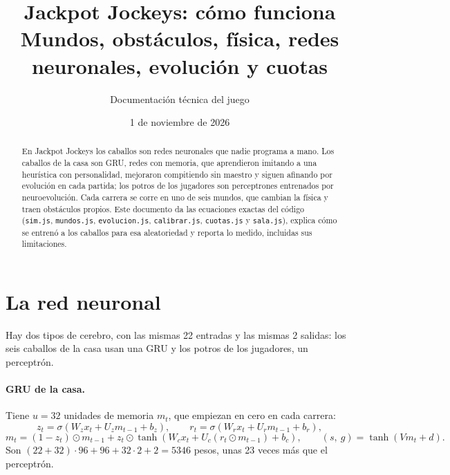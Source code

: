\documentclass[11pt,letterpaper]{article}
\title{\textbf{Jackpot Jockeys: cómo funciona}\\[4pt]\large Mundos, obstáculos, física, redes neuronales, evolución y cuotas}
\author{Documentación técnica del juego}
\date{1 de noviembre de 2026}
\begin{document}
\maketitle

\begin{abstract}
En Jackpot Jockeys los caballos son redes neuronales que nadie programa a mano. Los caballos de la casa son GRU, redes con memoria, que aprendieron imitando a una heurística con personalidad, mejoraron compitiendo sin maestro y siguen afinando por evolución en cada partida; los potros de los jugadores son perceptrones entrenados por neuroevolución. Cada carrera se corre en uno de seis mundos, que cambian la física y traen obstáculos propios. Este documento da las ecuaciones exactas del código (\texttt{sim.js}, \texttt{mundos.js}, \texttt{evolucion.js}, \texttt{calibrar.js}, \texttt{cuotas.js} y \texttt{sala.js}), explica cómo se entrenó a los caballos para esa aleatoriedad y reporta lo medido, incluidas sus limitaciones.
\end{abstract}

\tableofcontents

\section{La red neuronal}
Hay dos tipos de cerebro, con las mismas 22 entradas y las mismas 2 salidas: los seis caballos de la casa usan una GRU y los potros de los jugadores, un perceptrón.

\paragraph{GRU de la casa.} Tiene $u = 32$ unidades de memoria $m_t$, que empiezan en cero en cada carrera:
\begin{equation}
z_t = \sigma\!\left(W_z x_t + U_z m_{t-1} + b_z\right), \qquad r_t = \sigma\!\left(W_r x_t + U_r m_{t-1} + b_r\right),
\end{equation}
\begin{equation}
m_t = (1 - z_t) \odot m_{t-1} + z_t \odot \tanh\!\left(W_c x_t + U_c (r_t \odot m_{t-1}) + b_c\right), \qquad (s,\ g) = \tanh\!\left(V m_t + d\right).
\end{equation}
Son $(22 + 32)\cdot 96 + 96 + 32\cdot 2 + 2 = 5346$ pesos, unas 23 veces más que el perceptrón.
\end{document}
